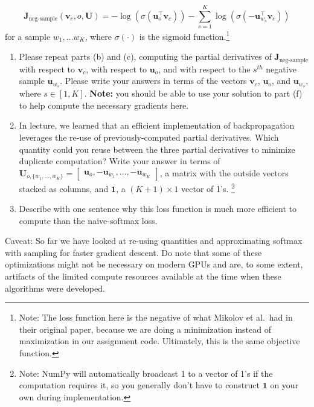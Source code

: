 \documentclass{article}
\begin{document}
\begin{enumerate}[label=(\alph*)]
\begin{equation}\label{loss-neg-sampling}
\bm J_{\text{neg-sample}}(\bm v_c, o, \bm U) = -\log(\sigma(\bm u_o^\top \bm v_c)) - \sum_{s=1}^K \log(\sigma(-\bm u_{w_s}^\top \bm v_c))
\end{equation}
for a sample $w_1, \ldots w_K$, where $\sigma(\cdot)$ is the sigmoid function.\footnote{Note: The loss function here is the negative of what Mikolov et al.\ had in their original paper, because we are doing a minimization instead of maximization in our assignment code. Ultimately, this is the same objective function.}

\begin{enumerate}[label=(\roman*)]
\item Please repeat parts (b) and (c), computing the partial derivatives of $\bm J_{\text{neg-sample}}$ with respect to $\bm v_c$, with respect to $\bm u_o$, and with respect to the $s^{th}$ negative sample $\bm u_{w_s}$. Please write your answers in terms of the vectors $\bm v_c$, $\bm u_o$, and $\bm u_{w_s}$, where $s \in [1, K]$. \textbf{Note:} you should be able to use your solution to part (f) to help compute the necessary gradients here.

\item In lecture, we learned that an efficient implementation of backpropagation leverages the re-use of previously-computed partial derivatives. Which quantity could you reuse between the three partial derivatives to minimize duplicate computation? Write your answer in terms of \\ $\bm{U}_{o, \{w_1, \dots, w_K\}} = \begin{bmatrix} \bm{u}_o, -\bm{u}_{w_1}, \dots, -\bm{u}_{w_K} \end{bmatrix}$, a matrix with the outside vectors stacked as columns, and $\bm{1}$, a $(K + 1) \times 1$ vector of 1's. \footnote{Note: NumPy will automatically broadcast 1 to a vector of 1's if the computation requires it, so you generally don't have to construct $\bm{1}$ on your own during implementation.}

\item Describe with one sentence why this loss function is much more efficient to compute than the naive-softmax loss.
\end{enumerate}

Caveat: So far we have looked at re-using quantities and approximating softmax with sampling for faster gradient descent. Do note that some of these optimizations might not be necessary on modern GPUs and are, to some extent, artifacts of the limited compute resources available at the time when these algorithms were developed.


\end{enumerate}
\end{document}
